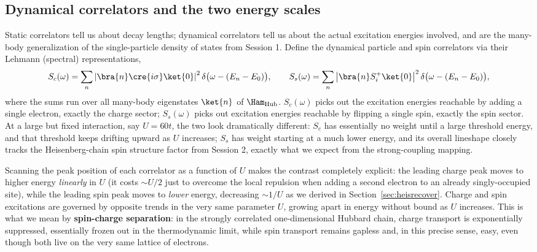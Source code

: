 \documentclass[all_sessions.tex]{subfiles}
\begin{document}
\subsection{Dynamical correlators and the two energy scales}
Static correlators tell us about decay lengths; dynamical correlators tell us about the actual
excitation energies involved, and are the many-body generalization of the single-particle density
of states from Session 1. Define the dynamical particle and spin correlators via their Lehmann
(spectral) representations,
\begin{equation}
  S_c(\omega) = \sum_n \left|\bra{n}\cre{i\sigma}\ket{0}\right|^2 \delta\big(\omega -
  (E_n-E_0)\big), \qquad
  S_s(\omega) = \sum_n \left|\bra{n}S_i^+\ket{0}\right|^2 \delta\big(\omega - (E_n-E_0)\big),
  \label{eq:dynamical}
\end{equation}
where the sums run over all many-body eigenstates $\ket{n}$ of $\Ham_{\mathrm{Hub}}$. $S_c(\omega)$
picks out the excitation energies reachable by adding a single electron, exactly the charge sector;
$S_s(\omega)$ picks out excitation energies reachable by flipping a single spin, exactly the spin
sector. At a large but fixed interaction, say $U=60t$, the two look dramatically different: $S_c$
has essentially no weight until a large threshold energy, and that threshold keeps drifting upward
as $U$ increases; $S_s$ has weight starting at a much lower energy, and its overall lineshape
closely tracks the Heisenberg-chain spin structure factor from Session 2, exactly what we expect
from the strong-coupling mapping.

Scanning the peak position of each correlator as a function of $U$ makes the contrast completely
explicit: the leading charge peak moves to higher energy \emph{linearly} in $U$ (it costs
$\sim U/2$ just to overcome the local repulsion when adding a second electron to an already
singly-occupied site), while the leading spin peak moves to \emph{lower} energy, decreasing $\sim
1/U$ as we derived in Section~\ref{sec:heisrecover}. Charge and spin excitations are governed by
opposite trends in the very same parameter $U$, growing apart in energy without bound as $U$
increases. This is what we mean by \textbf{spin-charge separation}: in the strongly correlated
one-dimensional Hubbard chain, charge transport is exponentially suppressed, essentially frozen out
in the thermodynamic limit, while spin transport remains gapless and, in this precise sense, easy,
even though both live on the very same lattice of electrons.
\end{document}
